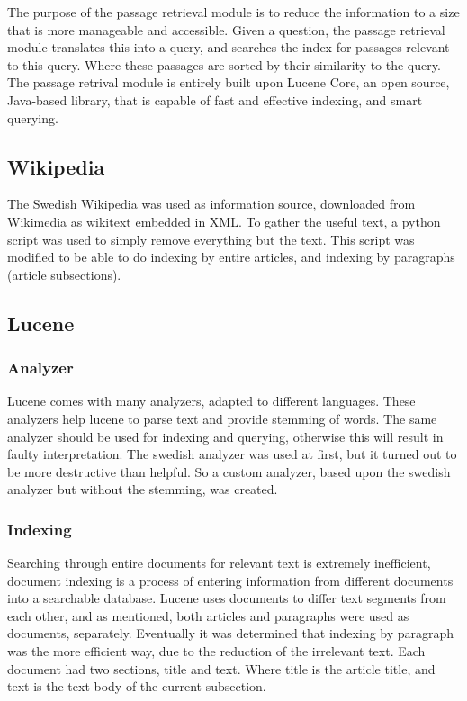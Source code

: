 The purpose of the passage retrieval module is to reduce the information to a size that is more manageable 
and accessible.
Given a question, the passage retrieval module translates this into a query, and searches the index for passages 
relevant to this query. Where these passages are sorted by their similarity to the query.
The passage retrival module is entirely built upon Lucene Core, an open source, Java-based library, 
that is capable of fast and effective indexing, and smart querying. \cite{lucenecore}

\subsection{Wikipedia}
The Swedish Wikipedia was used as information source, downloaded from Wikimedia \cite{wikimedia} as wikitext embedded in XML.
To gather the useful text, a python script \cite{wikiextractor} was used to simply remove everything but the text. 
This script was modified to be able to do indexing by entire articles, and indexing by paragraphs (article subsections).

\subsection{Lucene}

\subsubsection{Analyzer}
Lucene comes with many analyzers, adapted to different languages. 
These analyzers help lucene to parse text and provide stemming of words.
The same analyzer should be used for indexing and querying, otherwise this will result in faulty interpretation.
The swedish analyzer was used at first, but it turned out to be more destructive than helpful. 
So a custom analyzer, based upon the swedish analyzer but without the stemming, was created.

\subsubsection{Indexing}
Searching through entire documents for relevant text is extremely inefficient, 
document indexing is a process of entering information from different documents into a searchable database. 
Lucene uses documents to differ text segments from each other, and as mentioned, both articles and paragraphs were used as documents, separately.
Eventually it was determined that indexing by paragraph was the more efficient way, due to the reduction of the irrelevant text.
Each document had two sections, title and text. Where title is the article title, and text is the text body of the current subsection.

